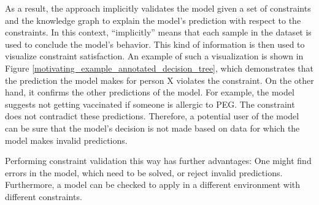     As a result, the approach implicitly validates the model given a set of constraints and the knowledge graph to explain the model's prediction with respect to the constraints. In this context, ``implicitly'' means that each sample in the dataset is used to conclude the model's behavior. This kind of information is then used to visualize constraint satisfaction. An example of such a visualization is shown in Figure \ref{motivating_example_annotated_decision_tree}, which demonstrates that the prediction the model makes for person X violates the constraint. On the other hand, it confirms the other predictions of the model. For example, the model suggests not getting vaccinated if someone is allergic to PEG. The constraint does not contradict these predictions. Therefore, a potential user of the model can be sure that the model's decision is not made based on data for which the model makes invalid predictions.
        
    Performing constraint validation this way has further advantages: One might find errors in the model, which need to be solved, or reject invalid predictions. Furthermore, a model can be checked to apply in a different environment with different constraints.

    
    
    
    
    
    
    

